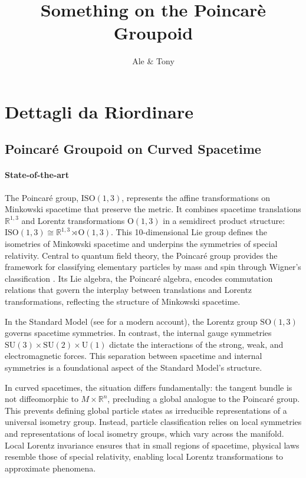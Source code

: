 \documentclass[11pt,a4paper]{article}
\title{Something on the Poincarè Groupoid}
\author{Ale \& Tony}
\date{}
\begin{document}
\maketitle




\section{Dettagli da Riordinare}
\subsection{Poincaré Groupoid on Curved Spacetime}
\label{wp:PoincareGroupoid}

\paragraph{State-of-the-art}
The Poincaré group, $\mathrm{ISO}(1,3)$, represents the affine transformations on Minkowski spacetime that preserve the metric. It combines spacetime translations $\mathbb{R}^{1,3}$ and Lorentz transformations $\mathrm{O}(1,3)$ in a semidirect product structure: $\mathrm{ISO}(1,3) \cong \mathbb{R}^{1,3} \rtimes \mathrm{O}(1,3)$. This 10-dimensional Lie group defines the isometries of Minkowski spacetime and underpins the symmetries of special relativity. Central to quantum field theory, the Poincaré group provides the framework for classifying elementary particles by mass and spin through Wigner's classification \cite{horowitz2021}. Its Lie algebra, the Poincaré algebra, encodes commutation relations that govern the interplay between translations and Lorentz transformations, reflecting the structure of Minkowski spacetime.

In the Standard Model (see \cite{Hamilton2017} for a modern account), the Lorentz group $\mathrm{SO}(1,3)$ governs spacetime symmetries. In contrast, the internal gauge symmetries $\mathrm{SU}(3) \times \mathrm{SU}(2) \times \mathrm{U}(1)$ dictate the interactions of the strong, weak, and electromagnetic forces. This separation between spacetime and internal symmetries is a foundational aspect of the Standard Model's structure.

In curved spacetimes, the situation differs fundamentally: the tangent bundle is not diffeomorphic to $M \times \mathbb{R}^n$, precluding a global analogue to the Poincaré group. This prevents defining global particle states as irreducible representations of a universal isometry group. Instead, particle classification relies on local symmetries and representations of local isometry groups, which vary across the manifold. Local Lorentz invariance ensures that in small regions of spacetime, physical laws resemble those of special relativity, enabling local Lorentz transformations to approximate phenomena.
\end{document}
